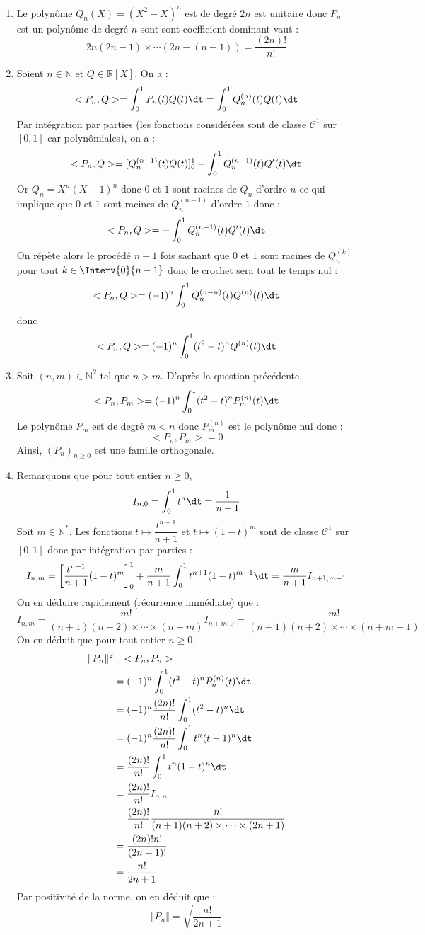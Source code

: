 \documentclass[a4paper,10pt]{report}
\begin{document}
\begin{enumerate}
\item Le polynôme $Q_n(X)=(X^2-X)^n$ est de degré $2n$ est unitaire donc $P_n$ est un polynôme de degré $n$ sont sont coefficient dominant vaut :
$$ 2n(2n-1) \times \cdots (2n-(n-1)) =\dfrac{(2n)!}{n!}$$
\item Soient $n \in \mathbb{N}$ et $Q \in \mathbb{R}[X]$. On a :
$$ <P_n,Q> = \int_0^1 P_n(t) Q(t) \dt = \int_0^1 Q_n^{(n)}(t) Q(t) \dt$$
Par intégration par parties (les fonctions considérées sont de classe $\mathcal{C}^1$ sur $[0,1]$ car polynômiales), on a :
$$ <P_n,Q> = [Q_n^{(n-1)}(t) Q(t)]_0^1 - \int_0^1 Q_n^{(n-1)}(t) Q'(t) \dt$$
Or $Q_n=X^n(X-1)^n$ donc $0$ et $1$ sont racines de $Q_n$ d'ordre $n$ ce qui implique que $0$ et $1$ sont racines de $Q_n^{(n-1)}$ d'ordre $1$ donc :
$$ <P_n,Q> =  - \int_0^1 Q_n^{(n-1)}(t) Q'(t) \dt$$
On répète alors le procédé $n-1$ fois sachant que $0$ et $1$ sont racines de $Q_n^{(k)}$ pour tout $k \in \Interv{0}{n-1}$ donc le \og crochet \fg{} sera tout le temps nul :
$$ <P_n,Q> = (-1)^n \int_0^1 Q_n^{(n-n)}(t) Q^{(n)}(t) \dt$$
donc
$$ <P_n,Q> = (-1)^n \int_{0}^1 (t^2-t)^n Q^{(n)}(t) \dt $$
\item Soit $(n,m) \in \mathbb{N}^2$ tel que $n>m$. D'après la question précédente,
$$ <P_n,P_m> = (-1)^n \int_{0}^1 (t^2-t)^n P_m^{(n)}(t) \dt$$
Le polynôme $P_m$ est de degré $m<n$ donc $P_m^{(n)}$ est le polynôme nul donc :
$$ <P_n,P_m>  = 0$$
Ainsi, $(P_n)_{n \geq 0}$ est une famille orthogonale.
\item Remarquons que pour tout entier $n \geq 0$,
$$ I_{n,0} = \int_0^1 t^n \dt = \dfrac{1}{n+1}$$
Soit $m \in \mathbb{N}^*$. Les fonctions $t \mapsto \dfrac{t^{n+1}}{n+1}$ et $t \mapsto (1-t)^m$ sont de classe $\mathcal{C}^1$ sur $[0,1]$ donc par intégration par parties :
$$ I_{n,m} = \left[ \dfrac{t^{n+1}}{n+1}(1-t)^{m} \right]_0^1 + \dfrac{m}{n+1} \int_0^1 t^{n+1}(1-t)^{m-1} \dt =  \dfrac{m}{n+1} I_{n+1,m-1}$$
On en déduire rapidement (récurrence immédiate) que : 
$$ I_{n,m} = \dfrac{m!}{(n+1)(n+2) \times \cdots \times (n+m)} I_{n+m,0} =   \dfrac{m!}{(n+1)(n+2) \times \cdots \times (n+m+1)}$$
On en déduit que pour tout entier $n \geq 0$,
\begin{align*}
\Vert P_n \Vert^2 & = <P_n,P_n> \\
& = (-1)^n \int_{0}^1 (t^2-t)^n P_n^{(n)}(t) \dt \\
& = (-1)^n \dfrac{(2n)!}{n!} \int_{0}^1 (t^2-t)^n  \dt \\
& = (-1)^n \dfrac{(2n)!}{n!} \int_{0}^1t^n(t-1)^n  \dt \\
& = \dfrac{(2n)!}{n!} \int_{0}^1t^n(1-t)^n  \dt \\
& = \dfrac{(2n)!}{n!} I_{n,n} \\
& = \dfrac{(2n)!}{n!} \dfrac{n!}{(n+1)(n+2) \times \cdots \times (2n+1)} \\
& = \dfrac{(2n)!n!}{(2n+1)!} \\
& = \dfrac{n!}{2n+1}
\end{align*}
Par positivité de la norme, on en déduit que :
$$ \Vert P_n \Vert = \sqrt{\dfrac{n!}{2n+1}}$$
\end{enumerate}
\end{document}
